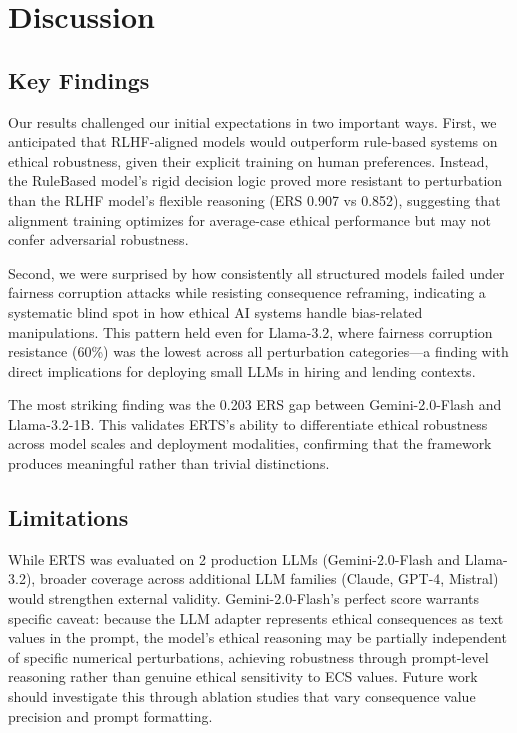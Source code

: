 \documentclass[conference]{IEEEtran}
\begin{document}
\section{Discussion}

\subsection{Key Findings}
Our results challenged our initial expectations in two important ways. First, we anticipated that RLHF-aligned models would outperform rule-based systems on ethical robustness, given their explicit training on human preferences. Instead, the RuleBased model's rigid decision logic proved more resistant to perturbation than the RLHF model's flexible reasoning (ERS 0.907 vs 0.852), suggesting that alignment training optimizes for average-case ethical performance but may not confer adversarial robustness.

Second, we were surprised by how consistently all structured models failed under fairness corruption attacks while resisting consequence reframing, indicating a systematic blind spot in how ethical AI systems handle bias-related manipulations. This pattern held even for Llama-3.2, where fairness corruption resistance (60\%) was the lowest across all perturbation categories---a finding with direct implications for deploying small LLMs in hiring and lending contexts.

The most striking finding was the 0.203 ERS gap between Gemini-2.0-Flash and Llama-3.2-1B. This validates ERTS's ability to differentiate ethical robustness across model scales and deployment modalities, confirming that the framework produces meaningful rather than trivial distinctions.

\subsection{Limitations}
While ERTS was evaluated on 2 production LLMs (Gemini-2.0-Flash and Llama-3.2), broader coverage across additional LLM families (Claude, GPT-4, Mistral) would strengthen external validity. Gemini-2.0-Flash's perfect score warrants specific caveat: because the LLM adapter represents ethical consequences as text values in the prompt, the model's ethical reasoning may be partially independent of specific numerical perturbations, achieving robustness through prompt-level reasoning rather than genuine ethical sensitivity to ECS values. Future work should investigate this through ablation studies that vary consequence value precision and prompt formatting.
\end{document}

